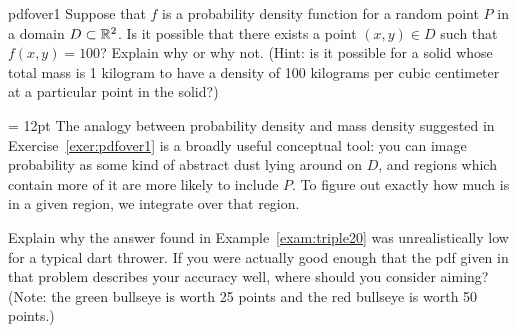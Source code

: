 \documentclass{watsonbook}
\begin{document}
\begin{exercise}{}{pdfover1}
  Suppose that $f$ is a probability density function for a random
  point $P$ in a domain $D\subset \mathbb{R}^2$. Is it possible that there
  exists a point $(x,y) \in D$ such that $f(x,y) = 100$? Explain why
  or why not. (Hint: is it possible for a solid whose total mass is 1
  kilogram to have a density of 100 kilograms per cubic centimeter at
  a particular point in the solid?)
\end{exercise}

\begin{minipage}[t]{0.55\textwidth} \parskip = 12pt 
  The analogy between probability density and mass density suggested
  in Exercise~\ref{exer:pdfover1} is a broadly useful conceptual tool:
  you can image probability as some kind of abstract dust lying around
  on $D$, and regions which contain more of it are more likely to
  include $P$. To figure out exactly how much is in a given region, we
  integrate over that region. 

  \begin{exercise}{}{}
    Explain why the answer found in Example~\ref{exam:triple20} was
    unrealistically low for a typical dart thrower. If you were
    actually good enough that the pdf given in that problem describes
    your accuracy well, where should you consider aiming? (Note: the green
    bullseye is worth 25 points and the red bullseye is worth 50
    points.)
  \end{exercise}
\end{minipage} \hfill
\end{document}
